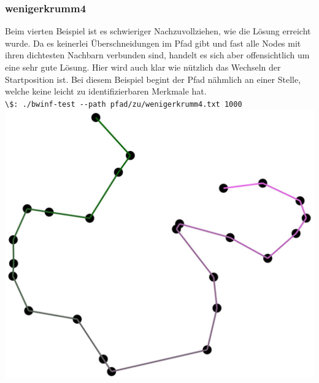 \documentclass[a4paper,10pt,ngerman]{scrartcl}
\begin{document}
    \subsubsection{wenigerkrumm4}
        Beim vierten Beispiel ist es schwieriger Nachzuvollziehen, wie die Lösung erreicht wurde. Da es keinerlei Überschneidungen im Pfad gibt und fast alle Nodes mit ihren dichtesten Nachbarn verbunden sind, handelt es sich aber offensichtlich um eine sehr gute Lösung. Hier wird auch klar wie nützlich das Wechseln der Startposition ist. Bei diesem Beispiel begint der Pfad nähmlich an einer Stelle, welche keine leicht zu identifizierbaren Merkmale hat.\\ 
        \lstinline{\$: ./bwinf-test --path pfad/zu/wenigerkrumm4.txt 1000} \\
        \includegraphics[]{output__wenigerkrumm4__1205.0686.jpg}
\end{document}
